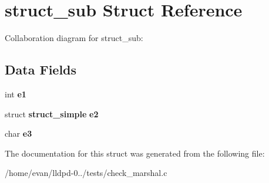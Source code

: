 \section{struct\-\_\-sub \-Struct \-Reference}
\label{structstruct__sub}


\-Collaboration diagram for struct\-\_\-sub\-:
\subsection*{\-Data \-Fields}
\begin{DoxyCompactItemize}
\item 
int {\bfseries e1}\label{structstruct__sub_a31466fc672991029a5d7a12c53b6ad5f}

\item 
struct {\bf struct\-\_\-simple} {\bfseries e2}\label{structstruct__sub_acc1409032c38cfd8c2667b81b887405f}

\item 
char {\bfseries e3}\label{structstruct__sub_a2a6739256a8c3cb3e196dd33c7faed34}

\end{DoxyCompactItemize}


\-The documentation for this struct was generated from the following file\-:\begin{DoxyCompactItemize}
\item 
/home/evan/lldpd-\/0../tests/check\-\_\-marshal.\-c\end{DoxyCompactItemize}
